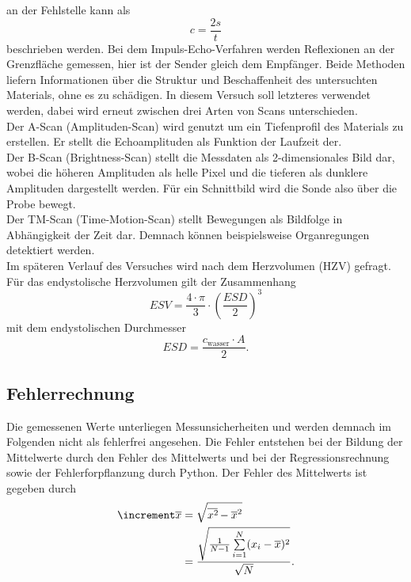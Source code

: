 an der Fehlstelle kann als
\begin{equation}
    \label{eqn:3}
    c = \frac{2s}{t}
\end{equation}
beschrieben werden.
Bei dem Impuls-Echo-Verfahren werden Reflexionen an der Grenzfläche gemessen, hier 
ist der Sender gleich dem Empfänger. Beide Methoden liefern Informationen über
die Struktur und Beschaffenheit des untersuchten Materials, ohne es zu schädigen.
In diesem Versuch soll letzteres verwendet werden, dabei wird erneut zwischen 
drei Arten von Scans unterschieden.
\vspace{0.5em}
\\
\noindent Der A-Scan (Amplituden-Scan) wird genutzt um ein Tiefenprofil des 
Materials zu erstellen. Er stellt die Echoamplituden als Funktion der Laufzeit
der.
\vspace{0.5em}
\\
\noindent Der B-Scan (Brightness-Scan) stellt die Messdaten als 2-dimensionales 
Bild dar, wobei die höheren Amplituden als helle Pixel und die tieferen als 
dunklere Amplituden dargestellt werden. Für ein Schnittbild wird die Sonde also 
über die Probe bewegt.
\vspace{0.5em}
\\
\noindent Der TM-Scan (Time-Motion-Scan) stellt Bewegungen als Bildfolge in 
Abhängigkeit der Zeit dar. Demnach können beispielsweise Organregungen 
detektiert werden.
\vspace{0.5em}
\\
\noindent Im späteren Verlauf des Versuches wird nach dem Herzvolumen (HZV) 
gefragt. Für das endystolische Herzvolumen gilt der Zusammenhang
\begin{equation}
    ESV = \frac{4\cdot \pi}{3}\cdot\left(\frac{ESD}{2}\right)^3
\end{equation}
\noindent mit dem endystolischen Durchmesser
\begin{equation}
    ESD = \frac{c_\text{wasser} \cdot A}{2}.
\end{equation}

\subsection{Fehlerrechnung}
Die gemessenen Werte unterliegen Messunsicherheiten und werden demnach im
Folgenden nicht als fehlerfrei angesehen. Die Fehler entstehen bei der
Bildung der Mittelwerte durch den Fehler des Mittelwerts und bei der
Regressionsrechnung sowie der Fehlerforpflanzung durch Python.
Der Fehler des Mittelwerts ist gegeben durch 
\begin{equation}
    \begin{aligned}
        \increment \overline{x} &= \sqrt{\overline{x^2\kern-0.1em} - \overline{x}^2} \\
                            &= \frac{\sqrt{\frac{1}{N-1} \sum\limits_{i=1}^N (x_i - \overline{x})^2}}{\sqrt{N}}.
    \end{aligned}
\end{equation}

